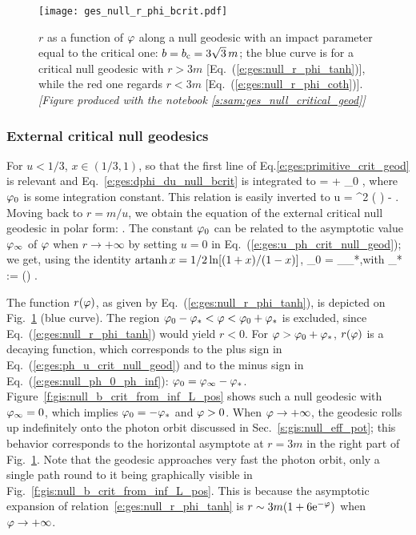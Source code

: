 \begin{figure}
\centerline{\texttt{[image: ges\_null\_r\_phi\_bcrit.pdf]}}
\caption[]{\label{f:gis:null_r_phi_bcrit} \footnotesize
$r$ as a function of $\varphi$ along a null geodesic with an impact parameter
equal to the critical one:
$b = b_{\rm c} = 3\sqrt{3} \, m$; the blue curve is for a critical
null geodesic with $r>3m$
[Eq.~(\ref{e:ges:null_r_phi_tanh})], while the red one
regards $r<3m$ [Eq.~(\ref{e:ges:null_r_phi_coth})].
\textsl{[Figure produced with the notebook \ref{s:sam:ges_null_critical_geod}]}
}
\end{figure}

\subsubsection{External critical null geodesics} \label{s:gis:extern_crit_geod}

For $u<1/3$, $x\in(1/3, 1)$, so that the first line of Eq.\eqref{e:ges:primitive_crit_geod}
is relevant and Eq.~\eqref{e:ges:dphi_du_null_bcrit} is integrated to
\be \label{e:ges:ph_u_crit_null_geod}
    \ph =  \artanh {} + \ph_0 ,
\ee
where $\varphi_0$ is some integration constant. This relation is easily inverted
to
\be \label{e:ges:u_ph_crit_null_geod}
    u =   \tanh^2 \left( \right) -  .
\ee
Moving back to $r = m/u$, we obtain the equation of the external critical
null geodesic in polar form:
\be \label{e:ges:null_r_phi_tanh}
   .
\ee
The constant $\varphi_0$ can be related to the asymptotic value $\varphi_\infty$ of $\varphi$
when $r\to +\infty$ by setting $u=0$ in Eq.~(\ref{e:ges:u_ph_crit_null_geod});
we get, using the identity $\operatorname{artanh} x = 1/2\ln[(1+x)/(1-x)]$,
\be \label{e:ges:null_ph_0_ph_inf}
    \ph_0 = \ph_\infty \pm \ph_*,\quad\mbox{with}\quad
    \ph_* := \ln\left(\right)
    .
\ee

The function $r(\varphi)$, as given by Eq.~(\ref{e:ges:null_r_phi_tanh}), is
depicted on Fig.~\ref{f:gis:null_r_phi_bcrit} (blue curve).
The region $\varphi_0-\varphi_* < \varphi < \varphi_0 + \varphi_*$ is excluded, since
Eq.~(\ref{e:ges:null_r_phi_tanh}) would yield $r<0$. For $\varphi > \varphi_0 + \varphi_*$,
$r(\varphi)$ is a decaying
function, which corresponds to the
plus sign in Eq.~(\ref{e:ges:ph_u_crit_null_geod}) and to the minus sign in
Eq.~(\ref{e:ges:null_ph_0_ph_inf}): $\varphi_0 = \varphi_\infty - \varphi_*$.
Figure~\ref{f:gis:null_b_crit_from_inf_L_pos} shows such a null geodesic with
$\varphi_\infty=0$, which implies $\varphi_0 = - \varphi_*$ and $\varphi>0$.
When $\varphi\to +\infty$, the geodesic rolls up indefinitely onto the photon
orbit discussed in Sec.~\ref{s:gis:null_eff_pot}; this
behavior corresponds to the horizontal asymptote at $r=3m$ in
the right part of Fig.~\ref{f:gis:null_r_phi_bcrit}.
Note that the geodesic approaches very fast the photon orbit, only a single
path round to it being graphically visible in Fig.~\ref{f:gis:null_b_crit_from_inf_L_pos}.
This is because the asymptotic expansion of relation~\eqref{e:ges:null_r_phi_tanh} is
$r\sim 3m(1+ 6\mathrm{e}^{-\varphi})$ when $\varphi\to+\infty$.

